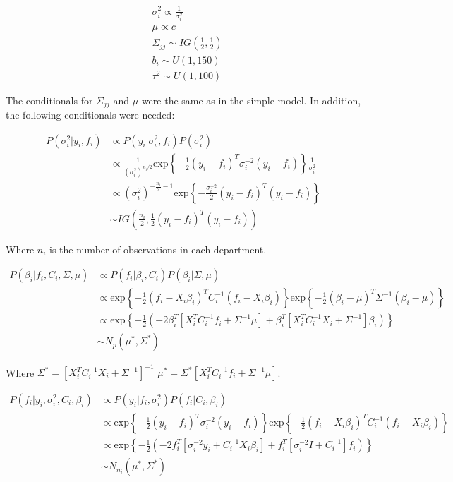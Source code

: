 \documentclass[paper=a4, fontsize=11pt]{scrartcl}
\begin{document}
\begin{align*}
    & \sigma^2_i \propto \frac{1}{\sigma^2_i}\\
    & \mu \propto c \\
    & \Sigma_{jj} \sim IG \left(\frac{1}{2}, \frac{1}{2} \right)\\
    & b_i \sim U(1, 150)\\
    & \tau^2 \sim U(1, 100)
\end{align*}


The conditionals for $\Sigma_{jj}$ and $\mu$ were the same as in the simple model. In  addition, the following conditionals were needed:



\begin{align*}
     P(\sigma^2_i |y_i, f_i ) & \propto P(y_i| \sigma^2_i, f_i)P(\sigma^2_i)\\
     & \propto \frac{1}{(\sigma^2_i)^{n_i/2}} \mbox{exp}\left \{ -\frac{1}{2}(y_i-f_i)^T \sigma^{-2}_i(y_i-f_i)      \right \} \frac{1}{\sigma^2_i}\\
      & \propto (\sigma^2_i)^{-\frac{n_i}{2}-1} \mbox{exp}\left \{ -\frac{\sigma^{-2}_i}{2}(y_i-f_i)^T (y_i-f_i)\right \} \\
      &  \sim IG\left(\frac{n_i}{2}, \frac{1}{2}(y_i-f_i)^T (y_i-f_i)\right)
\end{align*}

Where $n_i$ is the number of observations in each department.

\begin{align*}
     P(\beta_i | f_i, C_i, \Sigma, \mu ) & \propto P(f_i| \beta_i, C_i)P(\beta_i| \Sigma, \mu) \\
     & \propto\mbox{exp}\left \{ -\frac{1}{2}(f_i-X_i\beta_i)^T C^{-1}_i(f_i-X_i\beta_i)      \right \} \mbox{exp}\left \{ -\frac{1}{2}(\beta_i-\mu)^T \Sigma^{-1}(\beta_i-\mu)      \right \} \\
     & \propto \mbox{exp}\left \{ -\frac{1}{2}\left(-2\beta_i^T[X_i^TC_i^{-1}f_i + \Sigma^{-1}\mu] + \beta_i^T[X^T_iC_i^{-1}X_i + 
     \Sigma^{-1}]\beta_i \right)      \right \}\\
    &\sim N_p (\mu^*, \Sigma^*)
\end{align*}


Where  $\Sigma^*=[X^T_iC_i^{-1}X_i + 
     \Sigma^{-1}]^{-1} $ $\mu^*=\Sigma^*[X_i^TC_i^{-1}f_i + \Sigma^{-1}\mu]$.



\begin{align*}
     P(f_i |y_i, \sigma_i^2, C_i, \beta_i) & \propto P(y_i| f_i, \sigma_i^2)P(f_i|C_i, \beta_i) \\
      & \propto  \mbox{exp}\left \{ -\frac{1}{2}(y_i-f_i)^T \sigma^{-2}_i(y_i-f_i)      \right \} \mbox{exp}\left \{ -\frac{1}{2}(f_i-X_i\beta_i)^T C_i^{-1}(f_i-X_i\beta_i)      \right \} \\
       & \propto  \mbox{exp}\left \{ -\frac{1}{2}(-2f_i^T[\sigma_i^{-2}y_i + C_i^{-1}X_i\beta_i]+f_i^T[\sigma_i^{-2}I + C_i^{-1}]f_i) \right \}\\
        &\sim N_{n_i} (\mu^*, \Sigma^*)
\end{align*}
\end{document}
